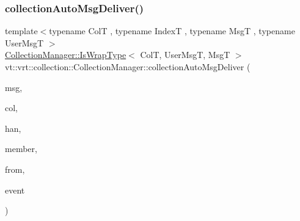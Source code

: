 \subsubsection{\texorpdfstring{collection\+Auto\+Msg\+Deliver()}{collectionAutoMsgDeliver()}\hspace{0.1cm}{\footnotesize\ttfamily [1/2]}}
{\footnotesize\ttfamily template$<$typename ColT , typename IndexT , typename MsgT , typename User\+MsgT $>$ \\
\hyperlink{structvt_1_1vrt_1_1collection_1_1_collection_manager_a1f91c97ed52237c3a3576dfbbe87c8f8}{Collection\+Manager\+::\+Is\+Wrap\+Type}$<$ ColT, User\+MsgT, MsgT $>$ vt\+::vrt\+::collection\+::\+Collection\+Manager\+::collection\+Auto\+Msg\+Deliver (\begin{DoxyParamCaption}\item[{MsgT $\ast$}]{msg,  }\item[{\hyperlink{structvt_1_1vrt_1_1collection_1_1_collection_base}{Collection\+Base}$<$ ColT, IndexT $>$ $\ast$}]{col,  }\item[{\hyperlink{namespacevt_af64846b57dfcaf104da3ef6967917573}{Handler\+Type}}]{han,  }\item[{bool}]{member,  }\item[{\hyperlink{namespacevt_a866da9d0efc19c0a1ce79e9e492f47e2}{Node\+Type}}]{from,  }\item[{\hyperlink{namespacevt_1_1trace_a64a7185f3e102df8d8258f263ccd1582}{trace\+::\+Trace\+Event\+I\+D\+Type}}]{event }\end{DoxyParamCaption})\hspace{0.3cm}{\ttfamily [static]}}

\mbox{\label{structvt_1_1vrt_1_1collection_1_1_collection_manager_a14b3a40fcde230a6113d032b8175d15d}} 
